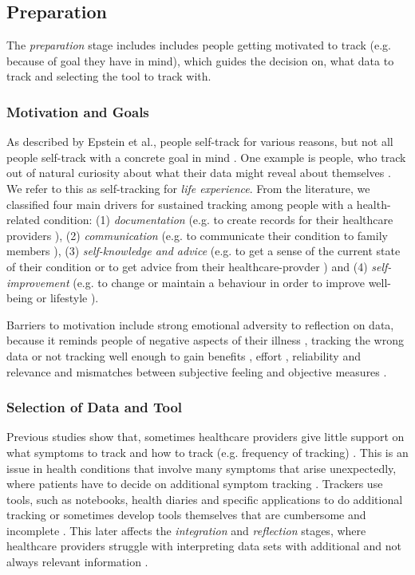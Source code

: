 \subsection{Preparation} 
The \textit{preparation} stage includes includes people getting motivated to track (e.g. because of goal they have in mind), which guides the decision on, what data to track and selecting the tool to track with. 

\subsubsection{Motivation and Goals} 
As described by Epstein et al., people self-track for various reasons, but not all people self-track with a concrete goal in mind \cite{Epstein2015}. One example is people, who track out of natural curiosity about what their data might reveal about themselves \cite{Li2010, Epstein2015}. We refer to this as self-tracking for \textit{life experience}. From the literature, we classified four main drivers for sustained tracking among people with a health-related condition: (1) \textit{documentation} (e.g. to create records for their healthcare providers \cite{Ancker2015}), (2) \textit{communication} (e.g. to communicate their condition to family members \cite{MacLeod2014}), (3) \textit{self-knowledge and advice} (e.g. to get a sense of the current state of their condition or to get advice from their healthcare-provder \cite{MacLeod2014, Ancker2015}) and (4) \textit{self-improvement} (e.g. to change or maintain a behaviour in order to improve well-being or lifestyle \cite{MacLeod2014, Ancker2015, Chung2016}).

Barriers to motivation include strong emotional adversity to reflection on data, because it reminds people of negative aspects of their illness \cite{Li2010, Ancker2015}, tracking the wrong data or not tracking well enough to gain benefits \cite{Chung2015}, effort \cite{Choe2014, Patel2012}, reliability and relevance \cite{Oh2015, piloting, Epstein2015} and mismatches between subjective feeling and objective measures \cite{Ancker2015}. 

\subsubsection{Selection of Data and Tool} 
Previous studies show that, sometimes healthcare providers give little support on what symptoms to track and how to track (e.g. frequency of tracking) \cite{Patel2012}. This is an issue in health conditions that involve many symptoms that arise unexpectedly, where patients have to decide on additional symptom tracking \cite{Patel2012, Chung2016}. Trackers use tools, such as notebooks, health diaries and specific applications to do additional tracking or sometimes develop tools themselves that are cumbersome and incomplete \cite{Patel2012}. This later affects the \textit{integration} and \textit{reflection} stages, where healthcare providers struggle with interpreting data sets with additional and not always relevant information \cite{Chung2015, Chung2016}.

